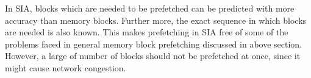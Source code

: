 In SIA, blocks which are needed to be prefetched can be predicted with more accuracy
than memory blocks. Further more, the exact sequence in which blocks are needed is also known.
This makes prefetching in SIA free of some of the problems faced in general memory
block prefetching discussed in above section. However, a large of number of blocks
should not be prefetched at once, since it might cause network congestion.
